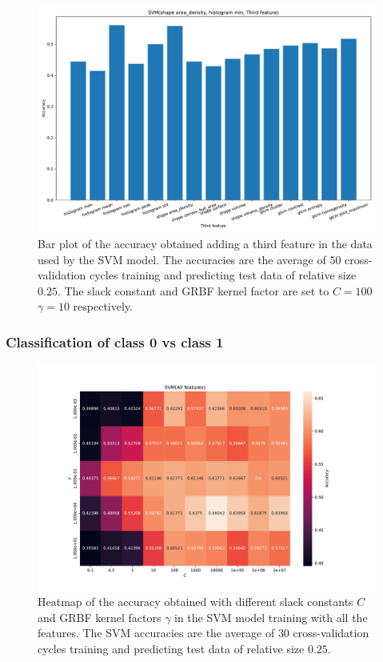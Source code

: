 \begin{figure}[H]
\centering
\includegraphics[width=1\textwidth]{Figures/third_feature1}
\caption{Bar plot of the accuracy obtained adding a third feature in the data used 
by the SVM model. The accuracies are the average 
of $50$ cross-validation cycles training and predicting test data of relative size $0.25$.
The slack constant and GRBF kernel factor are set to $C=100$  $\gamma=10 $ respectively. }
\label{fig:Figures-third_feature1}
\end{figure}


\subsubsection{Classification of class 0 vs class 1}

\begin{figure}[H]
\centering
\includegraphics[width=1\textwidth]{Figures/accuracy(C,gamma)4}
\caption{Heatmap of the accuracy obtained with different slack constants $C$ and 
GRBF kernel factors $\gamma $ in the SVM model training with all the features. The SVM accuracies are the average of $30$ cross-validation 
cycles training and predicting test data of relative size $0.25$.}
\label{fig:Figures-accuracy-C-gamma-4}
\end{figure}

